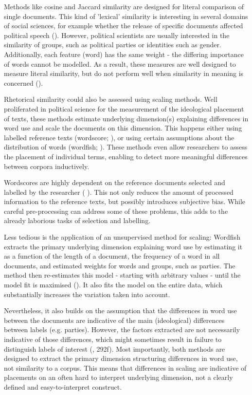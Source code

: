 \documentclass{article}
\begin{document}
Methods like cosine and Jaccard similarity are designed for literal comparison of single documents. This kind of 'lexical' similarity is interesting in several domains of social sciences, for example whether the release of specific documents affected political speech (\cite{Similarity2007a, Hager2020}). However, political scientists are usually interested in the similarity of groups, such as political parties or identities such as gender. Additionally, each feature (word) has the same weight - the differing importance of words cannot be modelled. As a result, these measures are well designed to measure literal similarity, but do not perform well when similarity in meaning is concerned (\cite{Prasetya2018}).\par

Rhetorical similarity could also be assessed using scaling methods. Well proliferated in political science for the measurement of the ideological placement of texts, these methods estimate underlying dimension(s) explaining differences in word use and scale the documents on this dimension. This happens either using labelled reference texts (wordscore; \cite{Laver2003}), or using certain assumptions about the distribution of words (wordfish; \cite{Slapin2008}). These methods even allow researchers to assess the placement of individual terms, enabling to detect more meaningful differences between corpora inductively. \par

Wordscores are highly dependent on the reference documents selected and labelled by the researcher ( \cite{Lowe2008}). This not only reduces the amount of processed information to the reference texts, but possibly introduces subjective bias. While careful pre-processing can address some of these problems, this adds to the already laborious tasks of selection and labelling.\par

Less tedious is the application of an unsupervised method for scaling: Wordfish extracts the primary underlying dimension explaining word use by estimating it as a function of the length of a document, the frequency of a word in all documents, and estimated weights for words and groups, such as parties. The method then re-estimates this model - starting with arbitrary values - until the model fit is maximised (\cite{Slapin2008}). It also fits the model on the entire data, which substantially increases the variation taken into account.\par

Nevertheless, it also builds on the assumption that the differences in word use between the documents are indicative of the main (ideological) differences between labels (e.g. parties). However, the factors extracted are not necessarily indicative of those differences, which might sometimes result in failure to distinguish labels of interest (\cite{Grimmer2013TextASData}, 292f). Most importantly, both methods are designed to extract the primary dimension structuring differences in word use, not similarity to a corpus. This means that differences in scaling are indicative of placements on an often hard to interpret underlying dimension, not a clearly defined and easy-to-interpret construct.\par
\end{document}
